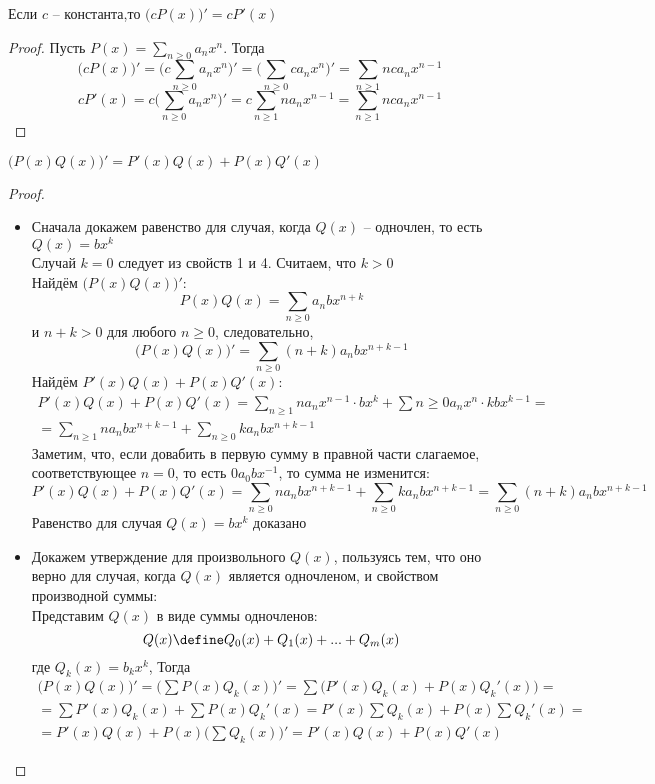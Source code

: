 \begin{props}
	\item Если $c$ -- константа,то $\bigg( cP(x) \bigg)' = cP'(x) $
	\begin{proof}
		Пусть $P(x) = \sum_{n \ge 0}a_nx^n$. Тогда
		$$ \bigg( cP(x) \bigg)' = \bigg( c\sum_{n \ge 0}a_nx^n \bigg)' = \bigg( \sum_{n \ge 0}ca_nx^n \bigg)' = \sum_{n \ge 1}nca_nx^{n - 1} $$
		$$ cP'(x) = c \bigg( \sum_{n \ge 0}a_nx^n \bigg)' = c \sum_{n \ge 1}na_nx^{n - 1} = \sum_{n \ge 1}nca_nx^{n - 1} $$
	\end{proof}
	\item $ \bigg( P(x)Q(x) \bigg)' = P'(x)Q(x) + P(x)Q'(x) $
	\begin{proof}
		\hfill
		\begin{itemize}
			\item Сначала докажем равенство для случая, когда $Q(x)$ -- одночлен, то есть $Q(x) = bx^k$ \\
			Случай $k = 0$ следует из свойств 1 и 4. Считаем, что $k > 0$ \\
			Найдём $ \bigg( P(x)Q(x) \bigg)'$:
			$$ P(x)Q(x) = \sum_{n \ge 0}a_nbx^{n + k} $$
			и $n + k > 0$ для любого $n \ge 0$, следовательно,
			$$ \bigg( P(x)Q(x) \bigg)' = \sum_{n \ge 0}(n + k)a_nbx^{n + k - 1} $$
			Найдём $P'(x)Q(x) + P(x)Q'(x)$:
			\begin{multline*}
				P'(x)Q(x) + P(x)Q'(x) = \sum_{n \ge 1}na_nx^{n - 1} \cdot bx^k + \sum{n \ge 0}a_nx^n \cdot kbx^{k - 1} = \\ = \sum_{n \ge 1}na_nbx^{n + k - 1} + \sum_{n \ge 0}ka_nbx^{n + k - 1}
			\end{multline*}
			Заметим, что, если довабить в первую сумму в правной части слагаемое, соответствующее $n = 0$, то есть $0a_0bx^{-1}$, то сумма не изменится:
			$$ P'(x)Q(x) + P(x)Q'(x) = \sum_{n \ge 0}na_nbx^{n + k - 1} + \sum_{n \ge 0}ka_nbx^{n + k - 1} = \sum_{n \ge 0}(n + k)a_nbx^{n + k - 1} $$
			Равенство для случая $Q(x) = bx^k$ доказано
			\item Докажем утверждение для произвольного $Q(x)$, пользуясь тем, что оно верно для случая, когда $Q(x)$ является одночленом, и свойством производной суммы: \\
			Представим $Q(x)$ в виде суммы одночленов:
			$$ Q(x) \define Q_0(x) + Q_1(x) + ... + Q_m(x) $$
			где $Q_k(x) = b_kx^k$, Тогда
			\begin{multline*}
				\bigg( P(x)Q(x) \bigg)' = \bigg( \sum P(x)Q_k(x) \bigg)' = \sum \bigg( P'(x)Q_k(x) + P(x)Q_k'(x) \bigg) = \\ = \sum P'(x)Q_k(x) + \sum P(x)Q_k'(x) = P'(x) \sum Q_k(x) + P(x) \sum Q_k'(x) = \\ = P'(x)Q(x) + P(x) \bigg( \sum Q_k(x) \bigg)' = P'(x)Q(x) + P(x)Q'(x)

\end{multline*}
\end{itemize}
\end{proof}
\end{props}

